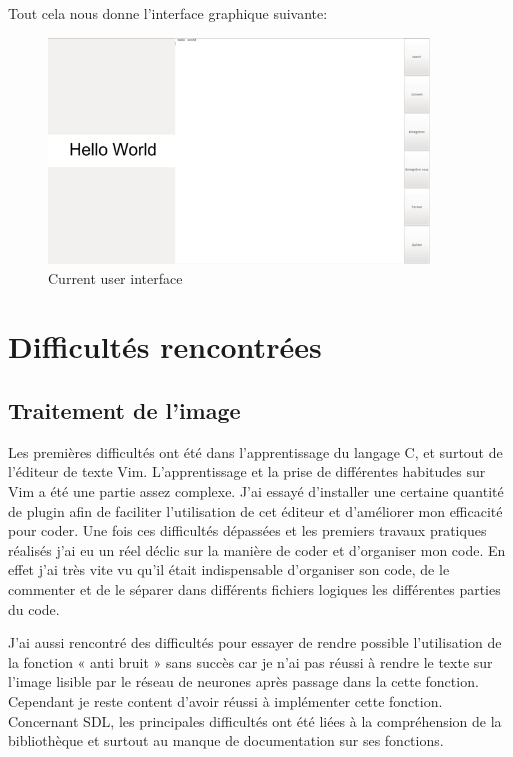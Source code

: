 \documentclass[12pt]{report}
\begin{document}
Tout cela nous donne l'interface graphique suivante:

\begin{figure}[H]
    \centering
    \includegraphics[width=0.9\textwidth]{UI_2}
    \caption{Current user interface}
\end{figure}

\chapter{Difficultés rencontrées}

\section*{Traitement de l'image}

Les premières difficultés ont été dans l’apprentissage du langage C, et surtout de l’éditeur de texte Vim. L’apprentissage et la prise de différentes habitudes sur Vim a été une partie assez complexe. J’ai essayé d’installer une certaine quantité de plugin afin de faciliter l’utilisation de cet éditeur et d’améliorer mon efficacité pour coder. Une fois ces difficultés dépassées et les premiers travaux pratiques réalisés j’ai eu un réel déclic sur la manière de coder et d’organiser mon code. En effet j’ai très vite vu qu’il était indispensable d’organiser son code, de le commenter et de le séparer dans différents fichiers logiques les différentes parties du code.

J’ai aussi rencontré des difficultés pour essayer de rendre possible l’utilisation de la fonction « anti bruit » sans succès car je n’ai pas réussi à rendre le texte sur l’image lisible par le réseau de neurones après passage dans la cette fonction. Cependant je reste content d’avoir réussi à implémenter cette fonction. Concernant SDL, les principales difficultés ont été liées à la compréhension de la bibliothèque et surtout au manque de documentation sur ses fonctions.
\end{document}
